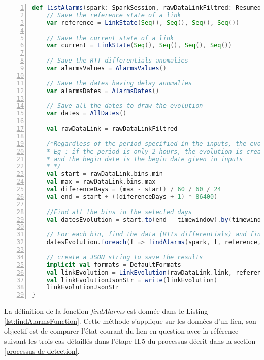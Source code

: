\begin{lstlisting}[language=scala,firstnumber=1, caption={Définition de la méthode listAlarms},label={lst:findAnalomalies}, basicstyle = \footnotesize,escapechar=|,numbers=left,
stepnumber=1]
  def listAlarms(spark: SparkSession, rawDataLinkFiltred: ResumedLink, timewindow: Int, rangeDates: Seq[Int]): String = {
	// Save the reference state of a link
	var reference = LinkState(Seq(), Seq(), Seq(), Seq())
	
	// Save the current state of a link
	var current = LinkState(Seq(), Seq(), Seq(), Seq())
	
	// Save the RTT differentials anomalies
	var alarmsValues = AlarmsValues()
	
	// Save the dates having delay anomalies
	var alarmsDates = AlarmsDates()
	
	// Save all the dates to draw the evolution 
	var dates = AllDates()
	
	val rawDataLink = rawDataLinkFiltred
	
	/*Regardless of the period specified in the inputs, the evolution is created for one or more days
	* Eg : if the period is only 2 hours, the evolution is created for 24 hours,
	* and the begin date is the begin date given in inputs
	* */
	val start = rawDataLink.bins.min
	val max = rawDataLink.bins.max
	val diferenceDays = (max - start) / 60 / 60 / 24
	val end = start + ((diferenceDays + 1) * 86400)
	
	//Find all the bins in the selected days
	val datesEvolution = start.to(end - timewindow).by(timewindow)
	
	// For each bin, find the data (RTTs differentials) and find alarms
	datesEvolution.foreach(f => findAlarms(spark, f, reference, rawDataLink, current, alarmsDates, alarmsValues, dates))
	
	// create a JSON string to save the results
	implicit val formats = DefaultFormats
	val linkEvolution = LinkEvolution(rawDataLink.link, reference, current, alarmsDates.dates, alarmsValues.medians, dates.dates)
	val linkEvolutionJsonStr = write(linkEvolution)
	linkEvolutionJsonStr
}
\end{lstlisting}

La définition de la fonction \textit{findAlarms} est donnée dans le Listing \ref{lst:findAlarmsFunction}. Cette méthode s'applique sur les données d'un lien,
son objectif  est de comparer l'état courant du lien en question avec la référence suivant les trois cas détaillés dans l'étape II.5 du processus décrit dans la section \ref{processus-de-detection}.


